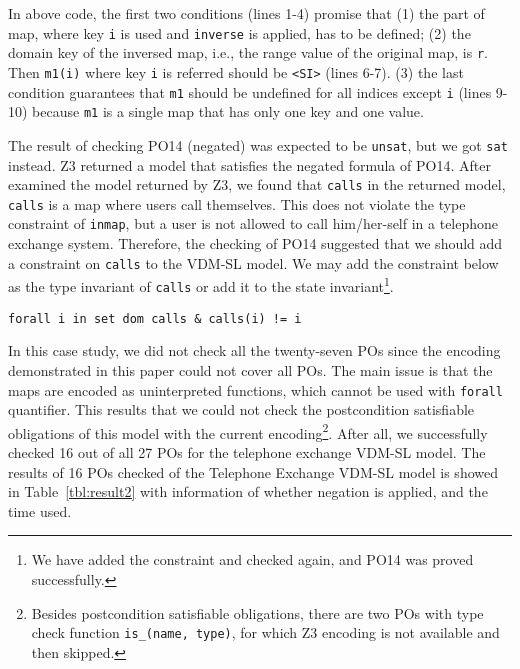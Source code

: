 In above code, the first two conditions (lines 1-4) promise that (1) the part of map, where key {\tt i} is used and {\tt inverse} is applied, has to be defined; (2) the domain key of the inversed map, i.e., the range value of the original map, is {\tt r}. Then {\tt m1(i)} where key {\tt i} is referred should be {\tt <SI>} (lines 6-7). (3) the last condition guarantees that {\tt m1} should be undefined for all indices except {\tt i} (lines 9-10) because {\tt m1} is a single map that has only one key and one value.

The result of checking PO14 (negated) was expected to be {\tt unsat}, but we got {\tt sat} instead. Z3 returned a model that satisfies the negated formula of PO14. After examined the model returned by Z3, we found that {\tt calls} in the returned model, {\tt calls} is a map where users call themselves. This does not violate the type constraint of {\tt inmap}, but a user is not allowed to call him/her-self in a telephone exchange system. Therefore, the checking of PO14 suggested that we should add a constraint on {\tt calls} to the VDM-SL model. We may add the constraint below as the type invariant of {\tt calls} or add it to the state invariant\footnote{We have added the constraint and checked again, and PO14 was proved successfully.}.

\begin{mdframed}[roundcorner=5pt]
\begin{Verbatim}[fontsize=\small]
forall i in set dom calls & calls(i) != i
\end{Verbatim}
\end{mdframed}

In this case study, we did not check all the twenty-seven POs since the encoding demonstrated in this paper could not cover all POs. The main issue is that the maps are encoded as uninterpreted functions, which cannot be used with {\tt forall} quantifier. This results that we could not check the postcondition satisfiable obligations of this model with the current encoding\footnote{Besides postcondition satisfiable obligations, there are two POs with type check function {\tt is\_(name, type)}, for which Z3 encoding is not available and then skipped.}. After all, we successfully checked 16 out of all 27 POs for the telephone exchange VDM-SL model. The results of 16 POs checked of the Telephone Exchange VDM-SL model is showed in Table~\ref{tbl:result2} with information of whether negation is applied, and the time used.

